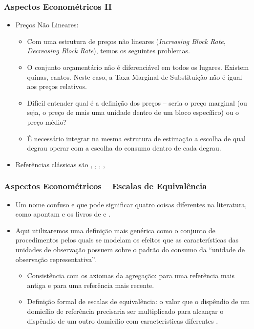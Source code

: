 \documentclass{beamer}
\begin{document}
\begin{frame}[fragile]\frametitle{Aspectos Econométricos II}
\begin{itemize}
	\item Preços Não Lineares:
	\begin{itemize}
		\item Com uma estrutura de preços não lineares (\textit{Increasing Block Rate}, \textit{Decreasing Block Rate}), temos os seguintes problemas.
		\item O conjunto orçamentário não é diferenciável em todos os lugares. Existem quinas, cantos. Neste caso, a Taxa Marginal de Substituição não é igual aos preços relativos.
		\item Difícil entender qual é a definição dos preços -- seria o preço marginal (ou seja, o preço de mais uma unidade dentro de um bloco específico) ou o preço médio?
		\item É necessário integrar na mesma estrutura de estimação a escolha de qual degrau operar com a escolha do consumo dentro de cada degrau.
	\end{itemize}
	\item Referências clássicas são \citet{Olmstead2007}, \citet{Moffitt2012}, \citet{Hewitt2018}, \citet{Hausman2016}, \citet{Moffitt2012a}
\end{itemize}
    


\end{frame}


\begin{frame}[fragile]\frametitle{Aspectos Econométricos -- Escalas de Equivalência}

\label{Equiv_Sc}

\begin{itemize}[<+->]
	\item Um nome confuso e que pode significar quatro coisas diferentes na literatura, como apontam \citet{Lewbel1997} e os livros de \citet{pollak_wales92} e \citet{DeatonBook80}.
	\item Aqui utilizaremos uma definição mais genérica como o conjunto de procedimentos pelos quais se modelam os efeitos que as características das unidades de observação possuem sobre o padrão do consumo da ``unidade de observação representativa''.
	\begin{itemize}[<+->]
		\item Consistência com os axiomas da agregação: \citet{Pollak1981} para uma referência mais antiga e \citet{Ray1983a} para uma referência mais recente.
		\item Definição formal de escalas de equivalência: o valor que o dispêndio de um domicílio de referência precisaria ser multiplicado para alcançar o dispêndio de um outro domicílio com características diferentes \citep{Lewbel1997}.
	\end{itemize}
\end{itemize}
    
\hyperlink{Econometrics}{}


\end{frame}
\end{document}
